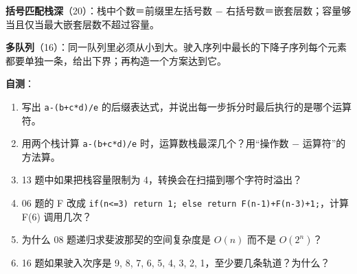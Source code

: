 \documentclass[10.5pt,a4paper,oneside]{article}
\providecommand{\tightlist}{\setlength{\itemsep}{2pt}\setlength{\parskip}{0pt}}
\begin{document}
\begin{summarybox}
\textbf{括号匹配栈深}（20）：栈中个数＝前缀里左括号数 −
右括号数＝嵌套层数；容量够当且仅当最大嵌套层数不超过容量。

\textbf{多队列}（16）：同一队列里必须从小到大。驶入序列中最长的下降子序列每个元素都要单独一条，给出下界；再构造一个方案达到它。

\textbf{自测}：

\begin{enumerate}
\def\labelenumi{\arabic{enumi}.}
\tightlist
\item
  写出 \texttt{a-(b+c*d)/e}
  的后缀表达式，并说出每一步拆分时最后执行的是哪个运算符。
\item
  用两个栈计算 \texttt{a-(b+c*d)/e} 时，运算数栈最深几个？用“操作数 −
  运算符”的方法算。
\item
  13 题中如果把栈容量限制为 4，转换会在扫描到哪个字符时溢出？
\item
  06 题的 F 改成
  \texttt{if(n\textless{}=3)\ return\ 1;\ else\ return\ F(n-1)+F(n-3)+1;}，计算
  F(6) 调用几次？
\item
  为什么 08 题递归求斐波那契的空间复杂度是 \(O(n)\) 而不是 \(O(2^n)\)？
\item
  16 题如果驶入次序是 9, 8, 7, 6, 5, 4, 3, 2,
  1，至少要几条轨道？为什么？
\end{enumerate}

\end{summarybox}
\end{document}
